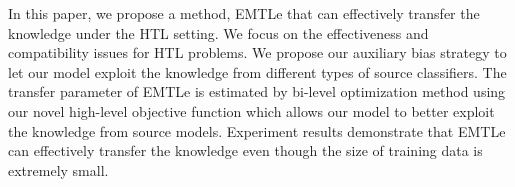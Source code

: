 In this paper, we propose a method, EMTLe that can effectively transfer the knowledge under the HTL setting. We focus on the effectiveness and compatibility issues for HTL problems. We propose our auxiliary bias strategy to let our model exploit the knowledge from different types of source classifiers. The transfer parameter of EMTLe is estimated by bi-level optimization method using our novel high-level objective function which allows our model to better exploit the knowledge from source models. Experiment results demonstrate that EMTLe can effectively transfer the knowledge even though the size of training data is extremely small.

